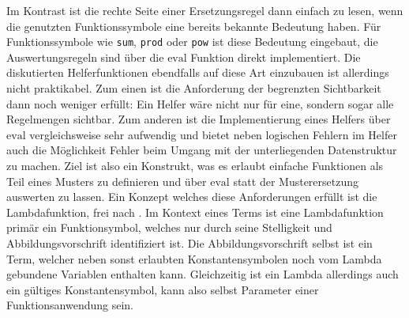 Im Kontrast ist die rechte Seite einer Ersetzungsregel dann einfach zu lesen, wenn die genutzten Funktionssymbole eine bereits bekannte Bedeutung haben. Für Funktionssymbole wie \texttt{sum}, \texttt{prod} oder \texttt{pow} ist diese Bedeutung eingebaut, die Auswertungsregeln sind über die $\mathrm{eval}$ Funktion direkt implementiert. Die diskutierten Helferfunktionen ebendfalls auf diese Art einzubauen ist allerdings nicht praktikabel. Zum einen ist die Anforderung der begrenzten Sichtbarkeit dann noch weniger erfüllt: Ein Helfer wäre nicht nur für eine, sondern sogar alle Regelmengen sichtbar. Zum anderen ist die Implementierung eines Helfers über $\mathrm{eval}$ vergleichsweise sehr aufwendig und bietet neben logischen Fehlern im Helfer auch die Möglichkeit Fehler beim Umgang mit der unterliegenden Datenstruktur zu machen. Ziel ist also ein Konstrukt, was es erlaubt einfache Funktionen als Teil eines Musters zu definieren und über $\mathrm{eval}$ statt der Musterersetzung auswerten zu lassen. 
Ein Konzept welches diese Anforderungen erfüllt ist die Lambdafunktion, frei nach \cite{ChurchLambda36}. Im Kontext eines Terms ist eine Lambdafunktion primär ein Funktionsymbol, welches nur durch seine Stelligkeit und Abbildungsvorschrift identifiziert ist. Die Abbildungsvorschrift selbst ist ein Term, welcher neben sonst erlaubten Konstantensymbolen noch vom Lambda gebundene Variablen enthalten kann. Gleichzeitig ist ein Lambda allerdings auch ein gültiges Konstantensymbol, kann also selbst Parameter einer Funktionsanwendung sein.


